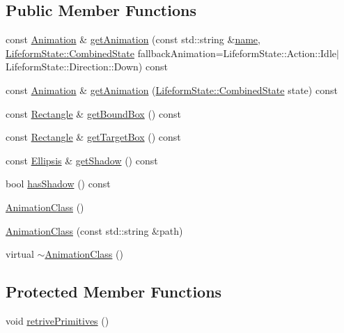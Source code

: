 \subsection*{Public Member Functions}
\begin{DoxyCompactItemize}
\item 
const \hyperlink{classZeta_1_1Animation}{Animation} \& \hyperlink{classZeta_1_1AnimationClass_a08189e19359afd81fbfc326ddbf4df67}{get\+Animation} (const std\+::string \&\hyperlink{classZeta_1_1Resource_a44c5721216f4beb31c0b3d2ef2aecf1d}{name}, \hyperlink{classZeta_1_1LifeformState_a877fbe4e8efefd0a5323f950909181b6}{Lifeform\+State\+::\+Combined\+State} fallback\+Animation=Lifeform\+State\+::\+Action\+::\+Idle$\vert$Lifeform\+State\+::\+Direction\+::\+Down) const 
\item 
const \hyperlink{classZeta_1_1Animation}{Animation} \& \hyperlink{classZeta_1_1AnimationClass_a83d5eab51620488465f3cc855ce63c81}{get\+Animation} (\hyperlink{classZeta_1_1LifeformState_a877fbe4e8efefd0a5323f950909181b6}{Lifeform\+State\+::\+Combined\+State} state) const 
\item 
const \hyperlink{classZeta_1_1Rectangle}{Rectangle} \& \hyperlink{classZeta_1_1AnimationClass_ade1b42c7e1174a6a0996c5d565178e58}{get\+Bound\+Box} () const 
\item 
const \hyperlink{classZeta_1_1Rectangle}{Rectangle} \& \hyperlink{classZeta_1_1AnimationClass_a49da6527fe78be2ea9960521791ee103}{get\+Target\+Box} () const 
\item 
const \hyperlink{classZeta_1_1Ellipsis}{Ellipsis} \& \hyperlink{classZeta_1_1AnimationClass_aee9e50033789d54b124747fc0148a7cf}{get\+Shadow} () const 
\item 
bool \hyperlink{classZeta_1_1AnimationClass_a5d0eab997f120d86e55fa81738935187}{has\+Shadow} () const 
\item 
\hyperlink{classZeta_1_1AnimationClass_a1f7a167d864f4699a52de6fe6d959615}{Animation\+Class} ()
\item 
\hyperlink{classZeta_1_1AnimationClass_a14cb2ae834895163a353e22e3ccefb30}{Animation\+Class} (const std\+::string \&path)
\item 
virtual \hyperlink{classZeta_1_1AnimationClass_ad30602ed6077999bc479e05e8fa4a689}{$\sim$\+Animation\+Class} ()
\end{DoxyCompactItemize}
\subsection*{Protected Member Functions}
\begin{DoxyCompactItemize}
\item 
void \hyperlink{classZeta_1_1AnimationClass_ab25150bb5125a485174e6bc1b2968216}{retrive\+Primitives} ()
\end{DoxyCompactItemize}
